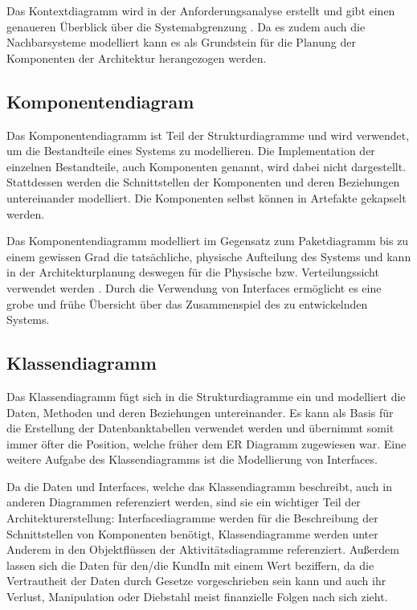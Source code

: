 Das Kontextdiagramm wird in der Anforderungsanalyse erstellt und gibt einen genaueren Überblick über die Systemabgrenzung \cite[S. 255]{glasklar}. Da es zudem auch die Nachbarsysteme modelliert kann es als Grundstein für die Planung der Komponenten der Architektur herangezogen werden.


\subsection{Komponentendiagram}
Das Komponentendiagramm ist Teil der Strukturdiagramme und wird verwendet, um die Bestandteile eines Systems zu modellieren. Die Implementation der einzelnen Bestandteile, auch Komponenten genannt, wird dabei nicht dargestellt. Stattdessen werden die Schnittstellen der Komponenten und deren Beziehungen untereinander modelliert. Die Komponenten selbst können in Artefakte gekapselt werden. \cite[S. 216]{glasklar}

Das Komponentendiagramm modelliert im Gegensatz zum Paketdiagramm bis zu einem gewissen Grad die tatsächliche, physische Aufteilung des Systems und kann in der Architekturplanung deswegen für die Physische bzw. Verteilungssicht verwendet werden \cite[S. 223]{glasklar}\cite[S. 139]{basiswissen}. Durch die Verwendung von Interfaces ermöglicht es eine grobe und frühe Übersicht über das Zusammenspiel des zu entwickelnden Systems.

\subsection{Klassendiagramm}
Das Klassendiagramm fügt sich in die Strukturdiagramme ein und modelliert die Daten, Methoden und deren Beziehungen untereinander. Es kann als Basis für die Erstellung der Datenbanktabellen verwendet werden und übernimmt somit immer öfter die Position, welche früher dem ER Diagramm zugewiesen war. Eine weitere Aufgabe des Klassendiagramms ist die Modellierung von Interfaces. \cite[S. 108-110]{glasklar}

Da die Daten und Interfaces, welche das Klassendiagramm beschreibt, auch in anderen Diagrammen referenziert werden, sind sie ein wichtiger Teil der Architekturerstellung: Interfacediagramme werden für die Beschreibung der Schnittstellen von Komponenten benötigt, Klassendiagramme werden unter Anderem in den Objektflüssen der Aktivitätsdiagramme referenziert. Außerdem lassen sich die Daten für den/die KundIn mit einem Wert beziffern, da die Vertrautheit der Daten durch Gesetze vorgeschrieben sein kann und auch ihr Verlust, Manipulation oder Diebstahl meist finanzielle Folgen nach sich zieht.


